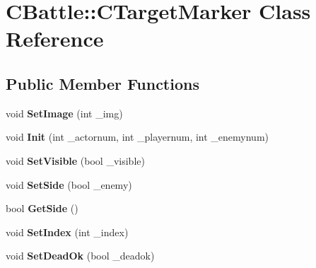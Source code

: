 \hypertarget{class_c_battle_1_1_c_target_marker}{}\section{C\+Battle\+:\+:C\+Target\+Marker Class Reference}
\label{class_c_battle_1_1_c_target_marker}
\subsection*{Public Member Functions}
\begin{DoxyCompactItemize}
\item 
void {\bfseries Set\+Image} (int \+\_\+img)\hypertarget{class_c_battle_1_1_c_target_marker_a768eef95ac308f399a2b241ab01285ab}{}\label{class_c_battle_1_1_c_target_marker_a768eef95ac308f399a2b241ab01285ab}

\item 
void {\bfseries Init} (int \+\_\+actornum, int \+\_\+playernum, int \+\_\+enemynum)\hypertarget{class_c_battle_1_1_c_target_marker_acd2713b509388985eb71c12da0020c2c}{}\label{class_c_battle_1_1_c_target_marker_acd2713b509388985eb71c12da0020c2c}

\item 
void {\bfseries Set\+Visible} (bool \+\_\+visible)\hypertarget{class_c_battle_1_1_c_target_marker_af1105a24b547b8c39aef1160d5df7871}{}\label{class_c_battle_1_1_c_target_marker_af1105a24b547b8c39aef1160d5df7871}

\item 
void {\bfseries Set\+Side} (bool \+\_\+enemy)\hypertarget{class_c_battle_1_1_c_target_marker_ac641dea3416e37314f028946608d5d97}{}\label{class_c_battle_1_1_c_target_marker_ac641dea3416e37314f028946608d5d97}

\item 
bool {\bfseries Get\+Side} ()\hypertarget{class_c_battle_1_1_c_target_marker_adc0e29f55095abe5ef7a3f9a4857030d}{}\label{class_c_battle_1_1_c_target_marker_adc0e29f55095abe5ef7a3f9a4857030d}

\item 
void {\bfseries Set\+Index} (int \+\_\+index)\hypertarget{class_c_battle_1_1_c_target_marker_aca1e3ece9c836d851077b5cd8ba57497}{}\label{class_c_battle_1_1_c_target_marker_aca1e3ece9c836d851077b5cd8ba57497}

\item 
void {\bfseries Set\+Dead\+Ok} (bool \+\_\+deadok)\hypertarget{class_c_battle_1_1_c_target_marker_ad760d3836d8e7bc111df170ce0c83e48}{}\label{class_c_battle_1_1_c_target_marker_ad760d3836d8e7bc111df170ce0c83e48}


\end{DoxyCompactItemize}
